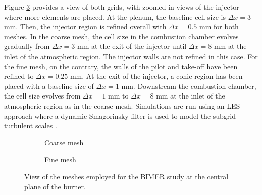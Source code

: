 
Figure \ref{fig:BIMER_meshes} provides a view of both grids, with zoomed-in views of the injector where more elements are placed. At the plenum, the baseline cell size is $\Delta x = 3$ mm. Then, the injector region is refined overall with $\Delta x = 0.5$ mm for both meshes. In the coarse mesh, the cell size in the combustion chamber  evolves gradually from $\Delta x = 3$ mm at the exit of the injector until $\Delta x = 8$ mm at the inlet of the atmospheric region. The injector walls are not refined in this case. For the fine mesh, on the contrary, the walls of the pilot and take-off have been refined to $\Delta x = 0.25$ mm. At the exit of the injector, a conic region has been placed with a baseline size of $\Delta x = 1$ mm. Downstream the combustion chamber, the cell size evolves from $\Delta x = 1$ mm to $\Delta x = 8$ mm at the inlet of the atmospheric region as in the coarse mesh. Simulations are run using an LES approach where a dynamic Smagorinsky filter is used to model the subgrid turbulent scales .

\newpage

\begin{figure}[ht]
\centering
\begin{subfigure}[b]{1.0\textwidth}
	\centering
   \caption{Coarse mesh}
   \label{fig:BIMER_mesh_coarse} 
\end{subfigure}
\begin{subfigure}[b]{1.0\textwidth}
	\centering
   \caption{Fine mesh}
   \label{fig:BIMER_mesh_fine}
\end{subfigure}
\caption{View of the meshes employed for the BIMER study at the central plane of the burner.}
\label{fig:BIMER_meshes}
\end{figure}



